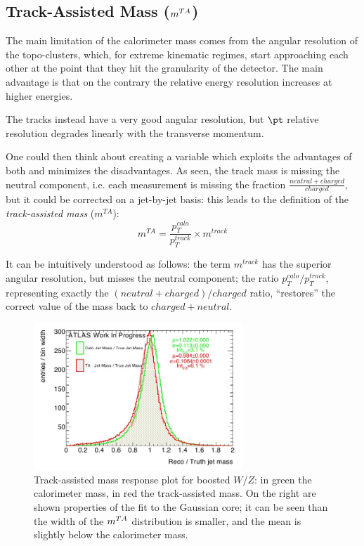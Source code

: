 
\subsection{Track-Assisted Mass ($\mta$)}\label{subsec:mta}
The main limitation of the calorimeter mass comes from the angular resolution of the topo-clusters, which, for extreme kinematic regimes, start approaching each other at the point that they hit the granularity of the detector. The main advantage is that on the contrary the relative energy resolution increases at higher energies.

The tracks instead have a very good angular resolution, but $\pt$ relative resolution degrades linearly with the transverse momentum. 

One could then think about creating a variable which exploits the advantages of both and minimizes the disadvantages. As seen, the track mass is missing the neutral component, i.e. each measurement is missing the fraction $\frac{neutral+charged}{charged}$, but it could be corrected on a jet-by-jet basis: this leads to the definition of the \textit{track-assisted mass} ($m^{TA}$):
\begin{equation}
 m^{TA}=\frac{p_T^{calo}}{p_T^{track}}\times m^{track}
\end{equation}

It can be intuitively understood as follows: the term $m^{track}$ has the superior angular resolution, but misses the neutral component; the ratio $p_T^{calo}/p_T^{track}$, representing exactly the $(neutral+charged)/charged$ ratio, ``restores'' the correct value of the mass back to $charged+neutral$.
\begin{figure}[!ht]
  \centering
      \includegraphics[width=0.7\textwidth]{jet_part/mta/allbinptmta.png}
  \caption[$\mcal$ and $\mta$ mass responses]{Track-assisted mass response plot for boosted $W/Z$: in green the calorimeter mass, in red the track-assisted mass. On the right are shown properties of the fit to the Gaussian core; it can be seen than the width of the $\mta$ distribution is smaller, and the mean is slightly below the calorimeter mass.}
  \label{fig:mta1}
\end{figure}

